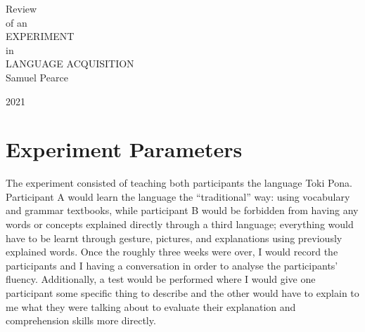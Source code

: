 \documentclass[a4paper,10pt]{article}
\begin{document}
\begingroup%
\centering
\vfill
\Huge{Review}\\
\Large{of an}\\
\Huge {EXPERIMENT}\\
\Large{in}\\
\Huge{LANGUAGE ACQUISITION}\\[\baselineskip]
\Large {Samuel Pearce}\par
\large{\scshape 2021}\par
\vfill\null
\endgroup

\begin{abstract}
	To test some personal theories on language acquisition vs. language learning, I undertook to
	teach two of my friends Toki Pona\footnotemark over the course of my probe-VA. The goal was to
	gain a better understanding of the process of teaching someone a language, what difficulties arise
	when teaching purely through immersion, and what the most prominent differences between two methods
	of language learning: immersion and the traditional approach of vocabulary and grammar books, as
	well as speculating on the optimal method of language learning. As one might expect, the answer is
	not as simple as just one or the other.
\end{abstract}


\pagebreak


\tableofcontents
\pagebreak


\section{Experiment Parameters}
The experiment consisted of teaching both participants the language Toki Pona. Participant A would
learn the language the ``traditional'' way: using vocabulary and grammar textbooks, while participant
B would be forbidden from having any words or concepts explained directly through a third language;
everything would have to be learnt through gesture, pictures, and explanations using previously
explained words. Once the roughly three weeks were over, I would record the participants and I having
a conversation in order to analyse the participants' fluency. Additionally, a test would be performed
where I would give one participant some specific thing to describe and the other would have to explain
to me what they were talking about to evaluate their explanation and comprehension skills more directly.
\end{document}
